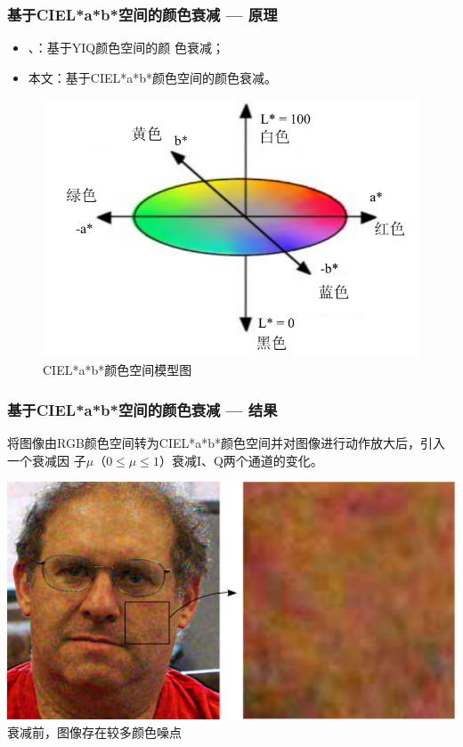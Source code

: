 \documentclass[xcolor=svgnames,serif,table,10pt]{beamer}
\begin{document}
\begin{frame}
  \frametitle{基于CIEL*a*b*空间的颜色衰减 --- 原理}
  \begin{itemize}
  \item \cite{wu2012eulerian}、\cite{Wadhwa2013PhaseBased}：基于YIQ颜色空间的颜
    色衰减；
  \item 本文：基于CIEL*a*b*颜色空间的颜色衰减。
  \end{itemize}

  \begin{figure}[htbp]
  \scriptsize
  \centering
  \includegraphics[width=.5\textwidth]{color-plate.pdf}\\
  CIEL*a*b*颜色空间模型图
  \end{figure}
\end{frame}

\begin{frame}
  \frametitle{基于CIEL*a*b*空间的颜色衰减 --- 结果}
  \small
  将图像由RGB颜色空间转为CIEL*a*b*颜色空间并对图像进行动作放大后，引入一个衰减因
  子\alert{$\mu$}（$0\le \mu \le 1$）衰减I、Q两个通道的变化。

  \begin{center}
    \includegraphics[width=.8\textwidth]{attenuation-before.png}\\
    衰减前，图像存在较多颜色噪点\\
  \end{center}
\end{frame}
\end{document}
